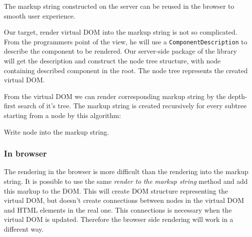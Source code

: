 \documentclass[oneside, 12pt]{book}
\begin{document}
      The markup string constructed on the server can be reused in the browser to smooth user experience. 

      Our target, render virtual DOM into the markup string is not so complicated.
      From the programmers point of the view, 
			he will use a \texttt{ComponentDescription} to describe the component to be rendered.
      Our server-side package of the library will get the description and construct the node tree structure, 
			with node containing described component in the root. 
      The node tree represents the created virtual DOM. 

      From the virtual DOM we can render corresponding markup string by the depth-first search of it's tree. 
			The markup string is created recursively for every subtree starting from a node by this algorithm:

      \begin{algorithm}[H]
        \caption{Write node into the markup string.}
      \end{algorithm}

    \subsubsection{In browser}\label{subsec:our-architecture-rendering-browser}
      The rendering in the browser is more difficult than the rendering into the markup string. 
			It is possible to use the same \textit{render to the markup string} method and add this markup to the DOM. 
			This will create DOM structure representing the virtual DOM, 
			but doesn't create connections between nodes in the virtual DOM and HTML elements in the real one. 
			This connections is necessary when the virtual DOM is updated.
			Therefore the browser side rendering will work in a different way. 
\end{document}
